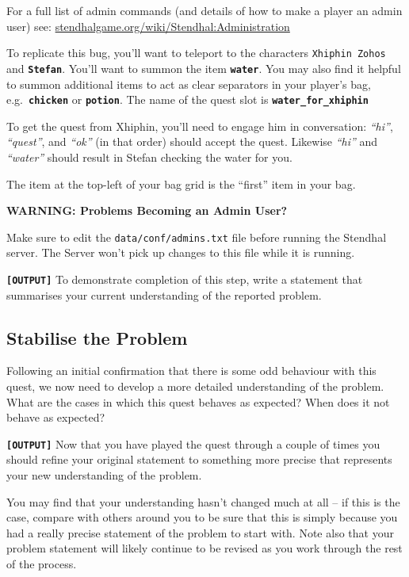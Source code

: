 \documentclass[
]{book}
\begin{document}
For a full list of admin commands (and details of how to make a player an admin user) see: \href{https://stendhalgame.org/wiki/Stendhal:Administration}{stendhalgame.org/wiki/Stendhal:Administration}

To replicate this bug, you'll want to teleport to the characters \texttt{Xhiphin\ Zohos} and \textbf{\texttt{Stefan}}. You'll want to summon the item \textbf{\texttt{water}}. You may also find it helpful to summon additional items to act as clear separators in your player's bag, e.g.~\textbf{\texttt{chicken}} or \textbf{\texttt{potion}}. The name of the quest slot is \textbf{\texttt{water\_for\_xhiphin}}

To get the quest from Xhiphin, you'll need to engage him in conversation: \emph{``hi''}, \emph{``quest''}, and \emph{``ok''} (in that order) should accept the quest. Likewise \emph{``hi''} and \emph{``water''} should result in Stefan checking the water for you.

The item at the top-left of your bag grid is the ``first'' item in your bag.

\textbf{WARNING: Problems Becoming an Admin User?}

Make sure to edit the \texttt{data/conf/admins.txt} file before running the Stendhal server. The Server won't pick up changes to this file while it is running.

\textbf{\texttt{{[}OUTPUT{]}}} To demonstrate completion of this step, write a statement that summarises your current understanding of the reported problem.

\hypertarget{stabilise}{%
\subsection{Stabilise the Problem}\label{stabilise}}

Following an initial confirmation that there is some odd behaviour with this quest, we now need to develop a more detailed understanding of the problem. What are the cases in which this quest behaves as expected? When does it not behave as expected?

\textbf{\texttt{{[}OUTPUT{]}}} Now that you have played the quest through a couple of times you should refine your original statement to something more precise that represents your new understanding of the problem.

You may find that your understanding hasn't changed much at all -- if this is the case, compare with others around you to be sure that this is simply because you had a really precise statement of the problem to start with. Note also that your problem statement will likely continue to be revised as you work through the rest of the process.
\end{document}
